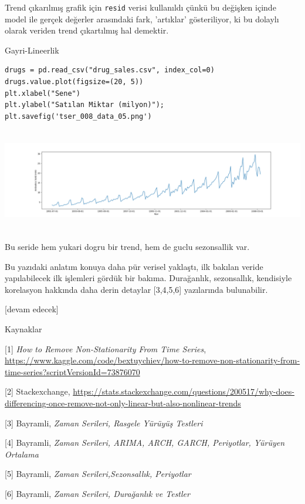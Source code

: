 \documentclass[12pt,fleqn]{article}\usepackage{../../common}
\begin{document}
Trend çıkarılmış grafik için \verb!resid! verisi kullanıldı çünkü bu değişken
içinde model ile gerçek değerler arasındaki fark, 'artıklar' gösteriliyor, ki bu
dolaylı olarak veriden trend çıkartılmış hal demektir.

Gayri-Lineerlik




\begin{verbatim}
drugs = pd.read_csv("drug_sales.csv", index_col=0)
drugs.value.plot(figsize=(20, 5))
plt.xlabel("Sene")
plt.ylabel("Satılan Miktar (milyon)");
plt.savefig('tser_008_data_05.png')
\end{verbatim}

\includegraphics[height=4.5cm]{tser_008_data_05.png}

Bu seride hem yukari dogru bir trend, hem de guclu sezonsallik var. 





Bu yazıdaki anlatım konuya daha pür verisel yaklaştı, ilk bakılan veride
yapılabilecek ilk işlemleri gördük bir bakıma. Durağanlık, sezonsallık,
kendisiyle korelasyon hakkında daha derin detaylar [3,4,5,6] yazılarında
bulunabilir.

[devam edecek]

Kaynaklar

[1] {\em How to Remove Non-Stationarity From Time Series},
    \url{https://www.kaggle.com/code/bextuychiev/how-to-remove-non-stationarity-from-time-series?scriptVersionId=73876070}

[2] Stackexchange,
    \url{https://stats.stackexchange.com/questions/200517/why-does-differencing-once-remove-not-only-linear-but-also-nonlinear-trends}

[3] Bayramli, {\em Zaman Serileri, Rasgele Yürüyüş Testleri}

[4] Bayramli, {\em Zaman Serileri, ARIMA, ARCH, GARCH, Periyotlar, Yürüyen Ortalama}

[5] Bayramli, {\em Zaman Serileri,Sezonsallık, Periyotlar}

[6] Bayramli, {\em Zaman Serileri, Durağanlık ve Testler}
\end{document}
